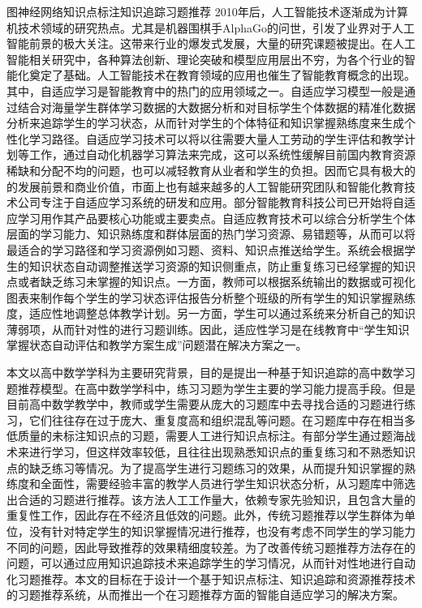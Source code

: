 
\begin{abstractC}{图神经网络}{知识点标注}{知识追踪}{习题推荐}{}
    2010年后，人工智能技术逐渐成为计算机技术领域的研究热点。尤其是机器围棋手AlphaGo的问世，引发了业界对于人工智能前景的极大关注。这带来行业的爆发式发展，大量的研究课题被提出。在人工智能相关研究中，各种算法创新、理论突破和模型应用层出不穷，为各个行业的智能化奠定了基础。人工智能技术在教育领域的应用也催生了智能教育概念的出现。其中，自适应学习是智能教育中的热门的应用领域之一。自适应学习模型一般是通过结合对海量学生群体学习数据的大数据分析和对目标学生个体数据的精准化数据分析来追踪学生的学习状态，从而针对学生的个体特征和知识掌握熟练度来生成个性化学习路径。自适应学习技术可以将以往需要大量人工劳动的学生评估和教学计划等工作，通过自动化机器学习算法来完成，这可以系统性缓解目前国内教育资源稀缺和分配不均的问题，也可以减轻教育从业者和学生的负担。因而它具有极大的的发展前景和商业价值，市面上也有越来越多的人工智能研究团队和智能化教育技术公司专注于自适应学习系统的研发和应用。部分智能教育科技公司已开始将自适应学习用作其产品要核心功能或主要卖点。自适应教育技术可以综合分析学生个体层面的学习能力、知识熟练度和群体层面的热门学习资源、易错题等，从而可以将最适合的学习路径和学习资源例如习题、资料、知识点推送给学生。系统会根据学生的知识状态自动调整推送学习资源的知识侧重点，防止重复练习已经掌握的知识点或者缺乏练习未掌握的知识点。一方面，教师可以根据系统输出的数据或可视化图表来制作每个学生的学习状态评估报告分析整个班级的所有学生的知识掌握熟练度，适应性地调整总体教学计划。另一方面，学生可以通过系统来分析自己的知识薄弱项，从而针对性的进行习题训练。因此，适应性学习是在线教育中``学生知识掌握状态自动评估和教学方案生成''问题潜在解决方案之一。

    本文以高中数学学科为主要研究背景，目的是提出一种基于知识追踪的高中数学习题推荐模型。在高中数学学科中，练习习题为学生主要的学习能力提高手段。但是目前高中数学教学中，教师或学生需要从庞大的习题库中去寻找合适的习题进行练习，它们往往存在过于庞大、重复度高和组织混乱等问题。在习题库中存在相当多低质量的未标注知识点的习题，需要人工进行知识点标注。有部分学生通过题海战术来进行学习，但这样效率较低，且往往出现熟悉知识点的重复练习和不熟悉知识点的缺乏练习等情况。为了提高学生进行习题练习的效果，从而提升知识掌握的熟练度和全面性，需要经验丰富的教学人员进行学生知识状态分析，从习题库中筛选出合适的习题进行推荐。该方法人工工作量大，依赖专家先验知识，且包含大量的重复性工作，因此存在不经济且低效的问题。此外，传统习题推荐以学生群体为单位，没有针对特定学生的知识掌握情况进行推荐，也没有考虑不同学生的学习能力不同的问题，因此导致推荐的效果精细度较差。为了改善传统习题推荐方法存在的问题，可以通过应用知识追踪技术来追踪学生的学习情况，从而针对性地进行自动化习题推荐。本文的目标在于设计一个基于知识点标注、知识追踪和资源推荐技术的习题推荐系统，从而推出一个在习题推荐方面的智能自适应学习的解决方案。


\end{abstractC}
